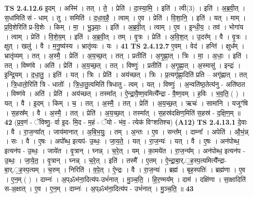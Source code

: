\documentclass[17pt]{extarticle}
\begin{document}
                  \newline
                                \textbf{ TS 2.4.12.6} \newline
                  इ॒दम् । अस्मि॑ । तत् । ते॒ । प्रेति॑ । दा॒स्या॒मि॒ । इति॑ । त्वी(3) । इति॑ । अ॒ब्र॒वी॒त् । स॒धांमिति॑ सं - धाम् । तु । समिति॑ । द॒धा॒व॒है॒ । त्वाम् । ए॒व । प्रेति॑ । वि॒शा॒नि॒ । इति॑ । यत् । माम् । प्र॒वि॒शेरिति॑ प्र-वि॒शेः । किम् । मा॒ । भु॒ञ्ज्याः॒ । इति॑ । अ॒ब्र॒वी॒त् । त्वाम् । ए॒व । इ॒न्धी॒य॒ । तव॑ । भोगा॑य । त्वाम् । प्रेति॑ । वि॒शे॒य॒म् । इति॑ । अ॒ब्र॒वी॒त् । तम् । वृ॒त्रः । प्रेति॑ । अ॒वि॒श॒त् । उ॒दर᳚म् । वै । वृ॒त्रः । क्षुत् । खलु॑ । वै । म॒नु॒ष्य॑स्य । भ्रातृ॑व्यः । यः । \textbf{  41} \newline
                  \newline
                                \textbf{ TS 2.4.12.7} \newline
                  ए॒वम् । वेद॑ । हन्ति॑ । क्षुध᳚म् । भ्रातृ॑व्यम् । तत् । अ॒स्मै॒ । प्रेति॑ । अ॒य॒च्छ॒त् । तत् । प्रतीति॑ । अ॒गृ॒ह्णा॒त् । त्रिः । मा॒ । अ॒धाः॒ । इति॑ । तत् । विष्ण॑वे । अति॑ । प्रेति॑ । अ॒य॒च्छ॒त् । तत् । विष्णुः॑ । प्रतीति॑ । अ॒गृ॒ह्णा॒त् । अ॒स्मासु॑ । इन्द्रः॑ । इ॒न्द्रि॒यम् । द॒धा॒तु॒ । इति॑ । यत् । त्रिः । प्रेति॑ । अय॑च्छत् । त्रिः । प्र॒त्यगृ॑ह्णा॒दिति॑ प्रति – अगृ॑ह्णात् । तत् । त्रि॒धातो॒रिति॑ त्रि - धातोः᳚ । त्रि॒धा॒तु॒त्वमिति॑ त्रिधातु - त्वम् । यत् । विष्णुः॑ । अ॒न्वति॑ष्ठ॒तेत्य॑नु - अति॑ष्ठत । विष्ण॑वे । अति॑ । प्रेति॑ । अय॑च्छत् । तस्मा᳚त् । ऐ॒न्द्रा॒वै॒ष्ण॒वमित्यै᳚न्द्रा - वै॒ष्ण॒वम् । ह॒विः । भ॒व॒ति॒ ( ) । यत् । वै । इ॒दम् । किम् । च॒ । तत् । अ॒स्मै॒ । तत् । प्रेति॑ । अ॒य॒च्छ॒त् । ऋचः॑ । सामा॑नि । यजूꣳ॑षि । स॒हस्र᳚म् । वै । अ॒स्मै॒ । तत् । प्रेति॑ । अ॒य॒च्छ॒त् । तस्मा᳚त् । स॒हस्र॑दक्षिण॒मिति॑ स॒हस्र॑ - द॒क्षि॒ण॒म् ॥ \textbf{  42} \newline
                  \newline
                      (प्र॒व॒णं - ॅविष्णु॒- र्वा इ॒द- मि॒द - म॒हं - ॅयो - भ॑व॒ - त्येक॑ विꣳशतिश्च)  \textbf{(A12)} \newline \newline
                                \textbf{ TS 2.4.13.1} \newline
                  दे॒वाः । वै । रा॒ज॒न्या᳚त् । जाय॑मानात् ।   अ॒बि॒भ॒युः॒ । तम् । अ॒न्तः । ए॒व । सन्त᳚म् ।   दाम्ना᳚ । अपेति॑ । औ॒भं॒न्न् । सः । वै । ए॒षः । अपो᳚ब्ध॒ इत्यप॑- उ॒ब्धः॒ । जा॒य॒ते॒ । यत् । रा॒ज॒न्यः॑ । यत् । वै । ए॒षः । अन॑पोब्ध॒ इत्यन॑प - उ॒ब्धः॒ । जाये॑त । वृ॒त्रान् । घ्नन्न् । च॒रे॒त् । यम् । का॒मये॑त । रा॒ज॒न्य᳚म् । अन॑पोब्ध॒ इत्यन॑प - उ॒ब्धः॒ । जा॒ये॒त॒ । वृ॒त्रान् । घ्नन्न् । च॒रे॒त् । इति॑ । तस्मै᳚ । ए॒तम् । ऐ॒न्द्रा॒बा॒र्.॒ह॒स्प॒त्यमित्यै᳚न्द्रा-बा॒र्.॒ह॒स्प॒त्यम् । च॒रुम् । निरिति॑ । व॒पे॒त् ।   ऐ॒न्द्रः । वै । रा॒ज॒न्यः॑ । ब्रह्म॑ । बृह॒स्पतिः॑ । ब्रह्म॑णा । ए॒व । ए॒न॒म् ( ) । दाम्नः॑ । अ॒प्ॐभ॑ना॒दित्य॑प-उभं॑नात् । मु॒ञ्च॒ति॒ । हि॒र॒ण्मय᳚म् । दाम॑ । दक्षि॑णा । सा॒क्षादिति॑ स-अ॒क्षात् । ए॒व । ए॒न॒म् । दाम्नः॑ । अ॒प्ॐभ॑ना॒दित्य॑प - उभं॑नात् । मु॒ञ्च॒ति॒ ॥ \textbf{  43} \newline
\end{document}
